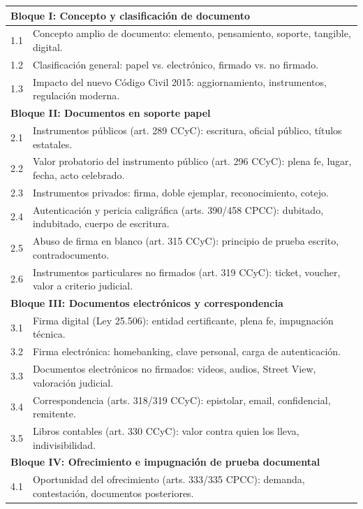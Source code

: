 \documentclass[12pt,oneside]{book}
\begin{document}
\begin{longtable}{p{}p{}}
\toprule
\multicolumn{2}{l}{\textbf{Bloque I: Concepto y clasificación de documento}} \\
\midrule
1.1 & Concepto amplio de documento: elemento, pensamiento, soporte, tangible, digital. \\
1.2 & Clasificación general: papel vs. electrónico, firmado vs. no firmado. \\
1.3 & Impacto del nuevo Código Civil 2015: aggiornamiento, instrumentos, regulación moderna. \\
\midrule
\multicolumn{2}{l}{\textbf{Bloque II: Documentos en soporte papel}} \\
\midrule
2.1 & Instrumentos públicos (art. 289 CCyC): escritura, oficial público, títulos estatales. \\
2.2 & Valor probatorio del instrumento público (art. 296 CCyC): plena fe, lugar, fecha, acto celebrado. \\
2.3 & Instrumentos privados: firma, doble ejemplar, reconocimiento, cotejo. \\
2.4 & Autenticación y pericia caligráfica (arts. 390/458 CPCC): dubitado, indubitado, cuerpo de escritura. \\
2.5 & Abuso de firma en blanco (art. 315 CCyC): principio de prueba escrito, contradocumento. \\
2.6 & Instrumentos particulares no firmados (art. 319 CCyC): ticket, voucher, valor a criterio judicial. \\
\midrule
\multicolumn{2}{l}{\textbf{Bloque III: Documentos electrónicos y correspondencia}} \\
\midrule
3.1 & Firma digital (Ley 25.506): entidad certificante, plena fe, impugnación técnica. \\
3.2 & Firma electrónica: homebanking, clave personal, carga de autenticación. \\
3.3 & Documentos electrónicos no firmados: videos, audios, Street View, valoración judicial. \\
3.4 & Correspondencia (arts. 318/319 CCyC): epistolar, email, confidencial, remitente. \\
3.5 & Libros contables (art. 330 CCyC): valor contra quien los lleva, indivisibilidad. \\
\midrule
\multicolumn{2}{l}{\textbf{Bloque IV: Ofrecimiento e impugnación de prueba documental}} \\
\midrule
4.1 & Oportunidad del ofrecimiento (arts. 333/335 CPCC): demanda, contestación, documentos posteriores. \\

\end{longtable}
\end{document}
